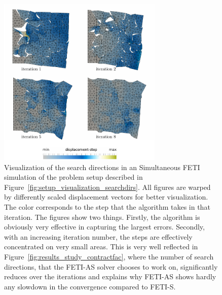 \begin{figure}[h!]
  \begin{center}
    \includegraphics[width=0.7\textwidth]{./fig/tikz/study_contractfac_steps_visualization.pdf}
    \caption[Visualization of search directions in FETI-S]{Visualization of the search directions in an Simultaneous FETI simulation of the problem setup described in Figure~\ref{fig:setup_visualization_searchdirs}. All figures are warped by differently scaled displacement vectors for better visualization. The color corresponds to the step that the algorithm takes in that iteration. The figures show two things. Firstly, the algorithm is obviously very effective in capturing the largest errors. Secondly, with an increasing iteration number, the steps are effectively concentrated on very small areas. This is very well reflected in Figure~\ref{fig:results_study_contractfac}, where the number of search directions, that the FETI-AS solver chooses to work on, significantly reduces over the iterations and explains why FETI-AS shows hardly any slowdown in the convergence compared to FETI-S.}
    \label{fig:visualization_fetias_searchdirs}
  \end{center}
\end{figure}


